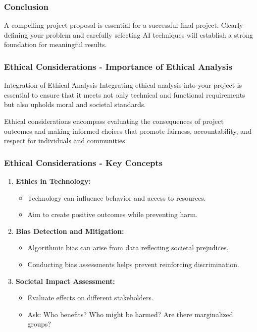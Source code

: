 \documentclass{beamer}
\begin{document}
\begin{frame}[fragile]
    \frametitle{Conclusion}
    A compelling project proposal is essential for a successful final project. Clearly defining your problem and carefully selecting AI techniques will establish a strong foundation for meaningful results.
\end{frame}

\begin{frame}[fragile]
    \frametitle{Ethical Considerations - Importance of Ethical Analysis}
    \begin{block}{Integration of Ethical Analysis}
        Integrating ethical analysis into your project is essential to ensure that it meets not only technical and functional requirements but also upholds moral and societal standards. 
    \end{block}
    
    Ethical considerations encompass evaluating the consequences of project outcomes and making informed choices that promote fairness, accountability, and respect for individuals and communities. 
\end{frame}

\begin{frame}[fragile]
    \frametitle{Ethical Considerations - Key Concepts}
    \begin{enumerate}
        \item \textbf{Ethics in Technology:}
        \begin{itemize}
            \item Technology can influence behavior and access to resources.
            \item Aim to create positive outcomes while preventing harm.
        \end{itemize}
        
        \item \textbf{Bias Detection and Mitigation:}
        \begin{itemize}
            \item Algorithmic bias can arise from data reflecting societal prejudices.
            \item Conducting bias assessments helps prevent reinforcing discrimination.
        \end{itemize}
        
        \item \textbf{Societal Impact Assessment:}
        \begin{itemize}
            \item Evaluate effects on different stakeholders.
            \item Ask: Who benefits? Who might be harmed? Are there marginalized groups?
        \end{itemize}
    \end{enumerate}
\end{frame}
\end{document}
